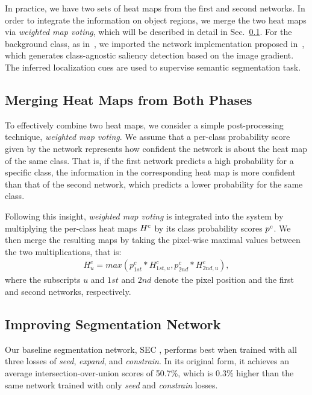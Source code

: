 \documentclass[10pt,twocolumn,letterpaper]{article}
\newcommand{\secref}[1]{Sec.~\ref{#1}}
\begin{document}
In practice, we have two sets of heat maps from the first and second networks. In order to integrate the information on object regions, we merge the two heat maps via \textit{weighted map voting}, which will be described in detail in \secref{sec::merging}. For the background class, as in~\cite{kolesnikov2016seed},  we imported the network implementation proposed in~\cite{SimonyanVZ13bg}, which generates class-agnostic saliency detection based on the image gradient. The inferred localization cues are used to supervise semantic segmentation task.

\subsection{Merging Heat Maps from Both Phases}
\label{sec::merging}
To effectively combine two heat maps, we consider a simple post-processing technique, \textit{weighted map voting}. We assume that a per-class probability score given by the network represents how confident the network is about the heat map of the same class. That is, if the first network predicts a high probability for a specific class, the information in the corresponding heat map is more confident than that of the second network, which predicts a lower probability for the same class.

Following this insight, \textit{weighted map voting} is integrated into the system by multiplying the per-class heat maps ${H\textsuperscript{c}}$ by its class probability scores ${p\textsuperscript{c}}$. We then merge the resulting maps by taking the pixel-wise maximal values between the two multiplications, that is:
\vspace{-1mm}
\begin{eqnarray}
   H_{u}^{c} =  max( p_{1st}^{c} * H_{1st,u}^{c}, p_{2nd}^{c} * H_{2nd,u}^{c}),
\label{eq:weightedMax}
\end{eqnarray}
where the subscripts $u$ and $1st$ and $2nd$ denote the pixel position and the first and second networks, respectively.



\subsection{Improving Segmentation Network}

Our baseline segmentation network, SEC \cite{kolesnikov2016seed}, performs best when trained with all three losses of \textit{seed}, \textit{expand}, and \textit{constrain}. In its original form, it achieves an average intersection-over-union scores of 50.7\%, which is 0.3\% higher than the same network trained with only \textit{seed} and \textit{constrain} losses.
\end{document}

